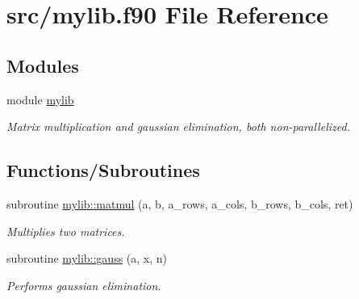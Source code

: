 \hypertarget{mylib_8f90}{}\section{src/mylib.f90 File Reference}
\label{mylib_8f90}
\subsection*{Modules}
\begin{DoxyCompactItemize}
\item 
module \mbox{\hyperlink{namespacemylib}{mylib}}
\begin{DoxyCompactList}\small\item\em Matrix multiplication and gaussian elimination, both non-\/parallelized. \end{DoxyCompactList}\end{DoxyCompactItemize}
\subsection*{Functions/\+Subroutines}
\begin{DoxyCompactItemize}
\item 
subroutine \mbox{\hyperlink{namespacemylib_ac17c34e6e3d726dd380e490dc4f20e23}{mylib\+::matmul}} (a, b, a\+\_\+rows, a\+\_\+cols, b\+\_\+rows, b\+\_\+cols, ret)
\begin{DoxyCompactList}\small\item\em Multiplies two matrices. \end{DoxyCompactList}\item 
subroutine \mbox{\hyperlink{namespacemylib_a83c3f9412da2b661a80b2ca3b8c04663}{mylib\+::gauss}} (a, x, n)
\begin{DoxyCompactList}\small\item\em Performs gaussian elimination. \end{DoxyCompactList}\end{DoxyCompactItemize}
